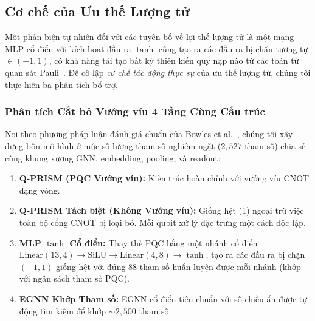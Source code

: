 \documentclass[10pt,twocolumn,letterpaper]{article}
\begin{document}
\subsection{Cơ chế của Ưu thế Lượng tử}
\label{sec:mechanism}

Một phản biện tự nhiên đối với các tuyên bố về lợi thế lượng tử là một mạng MLP cổ điển với kích hoạt đầu ra $\tanh$ cũng tạo ra các đầu ra bị chặn tương tự $\in (-1, 1)$, có khả năng tái tạo bất kỳ thiên kiến quy nạp nào từ các toán tử quan sát Pauli~\cite{bowles2024better}. Để cô lập \textit{cơ chế tác động thực sự} của ưu thế lượng tử, chúng tôi thực hiện ba phân tích bổ trợ.

\subsubsection{Phân tích Cắt bỏ Vướng víu 4 Tầng Cùng Cấu trúc}

Noi theo phương pháp luận đánh giá chuẩn của Bowles et al.~\cite{bowles2024better}, chúng tôi xây dựng bốn mô hình ở mức số lượng tham số nghiêm ngặt ($2{,}527$ tham số) chia sẻ cùng khung xương GNN, embedding, pooling, và readout:

\begin{enumerate}
    \item \textbf{Q-PRISM (PQC Vướng víu):} Kiến trúc hoàn chỉnh với vướng víu CNOT dạng vòng.
    \item \textbf{Q-PRISM Tách biệt (Không Vướng víu):} Giống hệt (1) ngoại trừ việc toàn bộ cổng CNOT bị loại bỏ. Mỗi qubit xử lý đặc trưng một cách độc lập.
    \item \textbf{MLP $\tanh$ Cổ điển:} Thay thế PQC bằng một nhánh cổ điển $\text{Linear}(13, 4) \to \text{SiLU} \to \text{Linear}(4, 8) \to \tanh$, tạo ra các đầu ra bị chặn $(-1, 1)$ giống hệt với đúng 88 tham số huấn luyện được mỗi nhánh (khớp với ngân sách tham số PQC).
    \item \textbf{EGNN Khớp Tham số:} EGNN cổ điển tiêu chuẩn với số chiều ẩn được tự động tìm kiếm để khớp $\sim 2{,}500$ tham số.
\end{enumerate}
\end{document}
